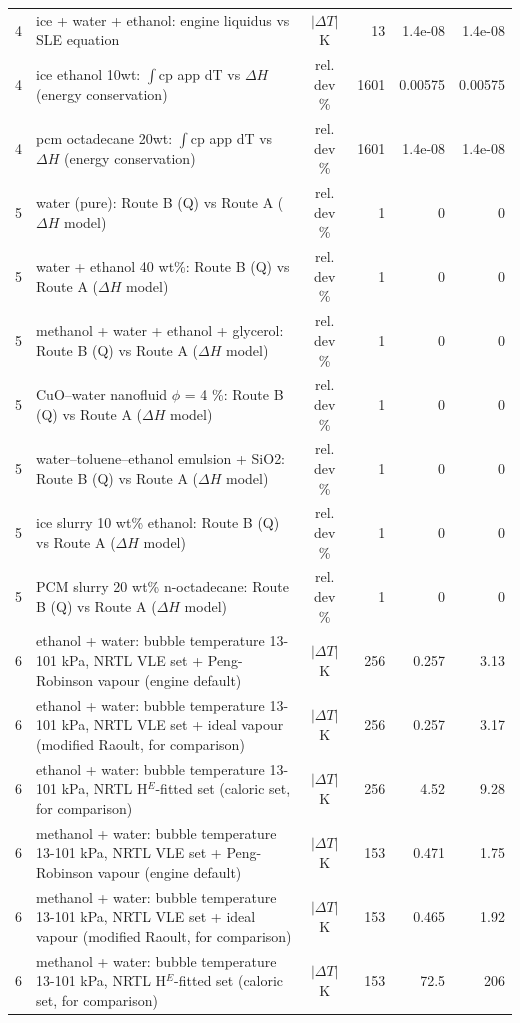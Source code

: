\begin{tabular}{c p{8.6cm} c r r r}
4 & ice + water + ethanol: engine liquidus vs SLE equation & $|\Delta T|$ K & 13 & 1.4e-08 & 1.4e-08 \\
4 & ice ethanol 10wt: $\int$cp app dT vs $\Delta H$ (energy conservation) & rel. dev \% & 1601 & 0.00575 & 0.00575 \\
4 & pcm octadecane 20wt: $\int$cp app dT vs $\Delta H$ (energy conservation) & rel. dev \% & 1601 & 1.4e-08 & 1.4e-08 \\
5 & water (pure): Route B (Q) vs Route A ($\Delta H$ model) & rel. dev \% & 1 & 0 & 0 \\
5 & water + ethanol 40 wt\%: Route B (Q) vs Route A ($\Delta H$ model) & rel. dev \% & 1 & 0 & 0 \\
5 & methanol + water + ethanol + glycerol: Route B (Q) vs Route A ($\Delta H$ model) & rel. dev \% & 1 & 0 & 0 \\
5 & CuO--water nanofluid $\phi$ = 4 \%: Route B (Q) vs Route A ($\Delta H$ model) & rel. dev \% & 1 & 0 & 0 \\
5 & water--toluene--ethanol emulsion + SiO2: Route B (Q) vs Route A ($\Delta H$ model) & rel. dev \% & 1 & 0 & 0 \\
5 & ice slurry 10 wt\% ethanol: Route B (Q) vs Route A ($\Delta H$ model) & rel. dev \% & 1 & 0 & 0 \\
5 & PCM slurry 20 wt\% n-octadecane: Route B (Q) vs Route A ($\Delta H$ model) & rel. dev \% & 1 & 0 & 0 \\
6 & ethanol + water: bubble temperature 13-101 kPa, NRTL VLE set + Peng-Robinson vapour (engine default) & $|\Delta T|$ K & 256 & 0.257 & 3.13 \\
6 & ethanol + water: bubble temperature 13-101 kPa, NRTL VLE set + ideal vapour (modified Raoult, for comparison) & $|\Delta T|$ K & 256 & 0.257 & 3.17 \\
6 & ethanol + water: bubble temperature 13-101 kPa, NRTL H$^E$-fitted set (caloric set, for comparison) & $|\Delta T|$ K & 256 & 4.52 & 9.28 \\
6 & methanol + water: bubble temperature 13-101 kPa, NRTL VLE set + Peng-Robinson vapour (engine default) & $|\Delta T|$ K & 153 & 0.471 & 1.75 \\
6 & methanol + water: bubble temperature 13-101 kPa, NRTL VLE set + ideal vapour (modified Raoult, for comparison) & $|\Delta T|$ K & 153 & 0.465 & 1.92 \\
6 & methanol + water: bubble temperature 13-101 kPa, NRTL H$^E$-fitted set (caloric set, for comparison) & $|\Delta T|$ K & 153 & 72.5 & 206 \\

\end{tabular}
